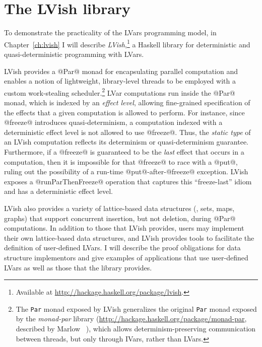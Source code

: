 \section{The LVish library}\label{s:intro-lvish}

To demonstrate the practicality of the LVars programming model, in
Chapter~\ref{ch:lvish} I will describe
\emph{LVish},\footnote{Available at
  \url{http://hackage.haskell.org/package/lvish}.} a Haskell library
for deterministic and quasi-deterministic programming with LVars.

LVish provides a @Par@ monad for encapsulating parallel computation
and enables a notion of lightweight, library-level threads to be
employed with a custom work-stealing scheduler.\footnote{The
  \lstinline|Par| monad exposed by LVish generalizes the original
  \lstinline|Par| monad exposed by the \emph{monad-par} library
  ({\url{http://hackage.haskell.org/package/monad-par}}, described by
  Marlow \etal~\cite{monad-par}), which allows determinism-preserving
  communication between threads, but only through IVars, rather than
  LVars.}  LVar computations run inside the @Par@ monad, which is
indexed by an \emph{effect level}, allowing fine-grained specification
of the effects that a given computation is allowed to perform.  For
instance, since @freeze@ introduces quasi-determinism, a computation
indexed with a deterministic effect level is not allowed to use
@freeze@.  Thus, the \emph{static type} of an LVish computation
reflects its determinism or quasi-determinism guarantee.  Furthermore,
if a @freeze@ is guaranteed to be the \emph{last} effect that occurs
in a computation, then it is impossible for that @freeze@ to race with
a @put@, ruling out the possibility of a run-time @put@-after-@freeze@
exception.  LVish exposes a @runParThenFreeze@ operation that captures
this ``freeze-last'' idiom and has a deterministic effect level.

LVish also provides a variety of lattice-based data structures (\eg,
sets, maps, graphs) that support concurrent insertion, but not
deletion, during @Par@ computations.  In addition to those that LVish
provides, users may implement their own lattice-based data structures,
and LVish provides tools to facilitate the definition of user-defined
LVars.  I will describe the proof obligations for data structure
implementors and give examples of applications that use user-defined
LVars as well as those that the library provides.

